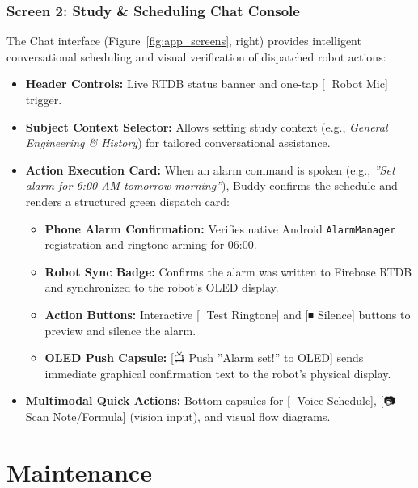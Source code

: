 \documentclass[11pt,a4paper,oneside]{report}
\newcommand{\ui}[1]{\textsf{#1}}
\begin{document}
\subsection{Screen 2: Study \& Scheduling Chat Console}
The Chat interface (Figure~\ref{fig:app_screens}, right) provides intelligent conversational scheduling and visual verification of dispatched robot actions:
\begin{itemize}[leftmargin=*]
\item \textbf{Header Controls:} Live RTDB status banner and one-tap \ui{[🎤 Robot Mic]} trigger.
\item \textbf{Subject Context Selector:} Allows setting study context (e.g., \emph{General Engineering \& History}) for tailored conversational assistance.
\item \textbf{Action Execution Card:} When an alarm command is spoken (e.g., \emph{''Set alarm for 6:00 AM tomorrow morning''}), Buddy confirms the schedule and renders a structured green dispatch card:
  \begin{itemize}
  \item \textbf{Phone Alarm Confirmation:} Verifies native Android \texttt{AlarmManager} registration and ringtone arming for 06:00.
  \item \textbf{Robot Sync Badge:} Confirms the alarm was written to Firebase RTDB and synchronized to the robot's OLED display.
  \item \textbf{Action Buttons:} Interactive \ui{[🔔 Test Ringtone]} and \ui{[⏹ Silence]} buttons to preview and silence the alarm.
  \item \textbf{OLED Push Capsule:} \ui{[📺 Push ''Alarm set!'' to OLED]} sends immediate graphical confirmation text to the robot's physical display.
  \end{itemize}
\item \textbf{Multimodal Quick Actions:} Bottom capsules for \ui{[📅 Voice Schedule]}, \ui{[📷 Scan Note/Formula]} (vision input), and visual flow diagrams.
\end{itemize}

\chapter{Maintenance}\label{ch:maint}
\end{document}
